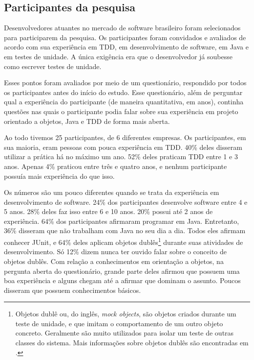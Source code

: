 \documentclass[conference]{IEEEtran}
\begin{document}
\subsection{Participantes da pesquisa}
\label{sec:planejamento-participantes}

Desenvolvedores atuantes no mercado de 
software brasileiro foram selecionados para participarem da pesquisa.
Os participantes foram convidados e avaliados de acordo com sua experiência em TDD,
em desenvolvimento de software, em Java e em testes de unidade. A única exigência
era que o desenvolvedor já soubesse como escrever testes de unidade.

Esses pontos foram avaliados por meio de um questionário, 
respondido por todos os participantes antes do início do estudo. 
Esse questionário, além de perguntar qual a experiência
do participante (de maneira quantitativa, em anos), 
continha questões nas quais o participante
podia falar sobre sua experiência em projeto orientado a objetos,
Java e TDD de forma mais aberta.

Ao todo tivemos 25 participantes, de 6 diferentes empresas.
Os participantes, em sua maioria, eram pessoas com pouca experiência em TDD.
40\% deles disseram utilizar a prática há no máximo um ano. 52\% deles praticam TDD
entre 1 e 3 anos. Apenas 4\% praticou entre três e quatro anos, e nenhum participante
possuía mais experiência do que isso. 

Os números são um pouco diferentes quando se trata da experiência em desenvolvimento
de software. 24\% dos participantes desenvolve software entre 4 e 5 anos.
28\% deles faz isso entre 6 e 10 anos. 20\% possui até 2 anos de experiência. 
64\% dos participantes afirmaram programar em Java. Entretanto,
36\% disseram que não trabalham com Java no seu dia a dia. Todos eles afirmam conhecer JUnit,
e 64\% deles aplicam objetos dublês\footnote{Objetos dublê ou, do inglês, 
\textit{mock objects}, são objetos criados durante um teste de unidade, e que imitam o comportamento de um
outro objeto concreto. Geralmente são muito utilizados para isolar um teste de outras classes
do sistema. Mais informações sobre objetos dublês são encontradas em \cite{mocks}.}
durante suas atividades de desenvolvimento. Só 12\% dizem nunca ter ouvido falar sobre o conceito de objetos dublês. 
Com relação a conhecimentos
em orientação a objetos, na pergunta aberta do questionário, grande parte deles 
afirmou que possuem uma boa experiência e alguns
chegam até a afirmar que dominam o assunto. Poucos disseram que possuem conhecimentos
básicos.
\end{document}
